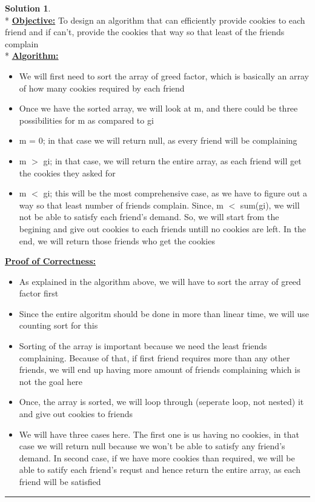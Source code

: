 \documentclass{article}
\theoremstyle{definition}
\def\fline{\rule{0.75\linewidth}{0.5pt}}
\newcommand{\finishline}{\vspace{-15pt}\begin{center}\fline\end{center}}
\newtheorem*{solution*}{Solution}
\newenvironment{solution}{\begin{solution*}}{{\finishline} \end{solution*}}
\begin{document}
\begin{solution}
	\hfill \bigskip\\*
	\textbf{\underline{Objective:}} To design an algorithm that can efficiently provide cookies to each friend and if can't, provide the cookies that way so that least of the friends complain\bigskip\\*
	\textbf{\underline{Algorithm:}}
	\begin{itemize}
		\item We will first need to sort the array of greed factor, which is basically an array of how many cookies required by each friend
		\item Once we have the sorted array, we will look at m, and there could be three possibilities for m as compared to gi
		\item[1.] m = 0; in that case we will return null, as every friend will be complaining
		\item[2.] m $>$ gi; in that case, we will return the entire array, as each friend will get the cookies they asked for
		\item[3.] m $<$ gi; this will be the most comprehensive case, as we have to figure out a way so that least number of friends complain. Since, m $<$ sum(gi), we will not be able to satisfy each friend's demand. So, we will start from the begining and give out cookies to each friends untill no cookies are left. In the end, we will return those friends who  get the  cookies
	\end{itemize} 
	\textbf{\underline{Proof of Correctness:}}
		\begin{itemize}
			\item As explained in the algorithm above, we will have to sort the array of greed factor first
			\item Since the entire algoritm should be done in more than linear time, we will use counting sort for this
			\item Sorting of the array is important because we need the least friends complaining. Because of that, if first friend requires more than any other friends, we will end up having more amount of friends complaining which is not the goal here	
			\item Once, the array is sorted, we will loop through (seperate loop, not nested) it and give out cookies to friends
			\item We will have three cases here. The first one is us having no cookies, in that case we will return null because we won't be able to satisfy any friend's demand. In second case, if we have more cookies than required, we will be able to satify each friend's requst and hence return the entire array, as each friend will be satisfied

\end{itemize}
\end{solution}
\end{document}
